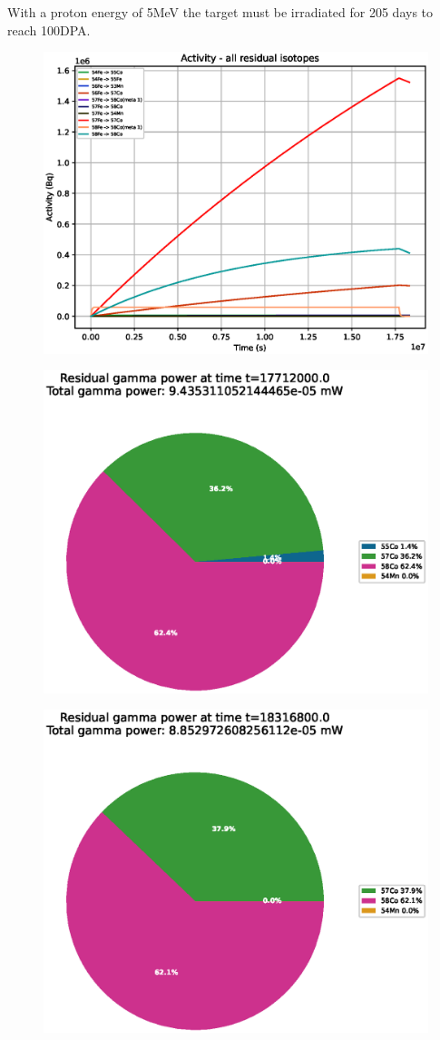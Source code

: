 With a proton energy of 5MeV the target must be irradiated for 205 days to reach 100DPA.

\begin{figure}[!htb]
\centering
\includegraphics[width=0.7\linewidth]{chapters/results_activity_code/fe_100dpa/by_isotope/05MeV_all_radioactive_isotopes.eps}
\caption{}
\label{fig:5mev-proton-100dpa-activity}
\end{figure}

\begin{figure}[!htb]
\centering
\includegraphics[width=0.7\linewidth]{chapters/results_activity_code/fe_100dpa/endofbeam/05MeV_0400_17712000.eps}
\caption{}
\label{fig:5mev-proton-100dpa}
\end{figure}

\begin{figure}[!htb]
\centering
\includegraphics[width=0.7\linewidth]{chapters/results_activity_code/fe_100dpa/endofbeam/05MeV_0500_18316800.eps}
\caption{}
\label{fig:5mev-proton-100dpa}
\end{figure}


